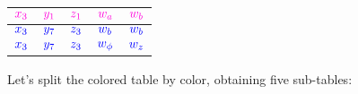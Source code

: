 \documentclass{article}
\begin{document}
{\begin{flushright}
\begin{tabular}{lllll}
    \multicolumn{1}{|c|}{$\textcolor{mywhat}{x_3}$} & \multicolumn{1}{c|}{$\textcolor{mywhat}{y_1}$} & \multicolumn{1}{c|}{$\textcolor{mywhat}{z_1}$} & \multicolumn{1}{c|}{$\textcolor{mywhat}{w_a}$} & \multicolumn{1}{c|}{$\textcolor{mywhat}{w_b}$}\\ \hline
    \multicolumn{1}{|c|}{$\textcolor{myblue}{x_3}$} & \multicolumn{1}{c|}{$\textcolor{myblue}{y_7}$} & \multicolumn{1}{c|}{$\textcolor{myblue}{z_3}$} & \multicolumn{1}{c|}{$\textcolor{myblue}{w_b}$} & \multicolumn{1}{c|}{$\textcolor{myblue}{w_b}$}\\ \hline
    \multicolumn{1}{|c|}{$\textcolor{myblue}{x_3}$} & \multicolumn{1}{c|}{$\textcolor{myblue}{y_7}$} & \multicolumn{1}{c|}{$\textcolor{myblue}{z_3}$} & \multicolumn{1}{c|}{$\textcolor{myblue}{w_\phi}$} & \multicolumn{1}{c|}{$\textcolor{myblue}{w_z}$}\\ \hline

\end{tabular}
\end{flushright}
}

Let's split the colored table by color, obtaining five sub-tables:

\vskip 0.2in
\end{document}

